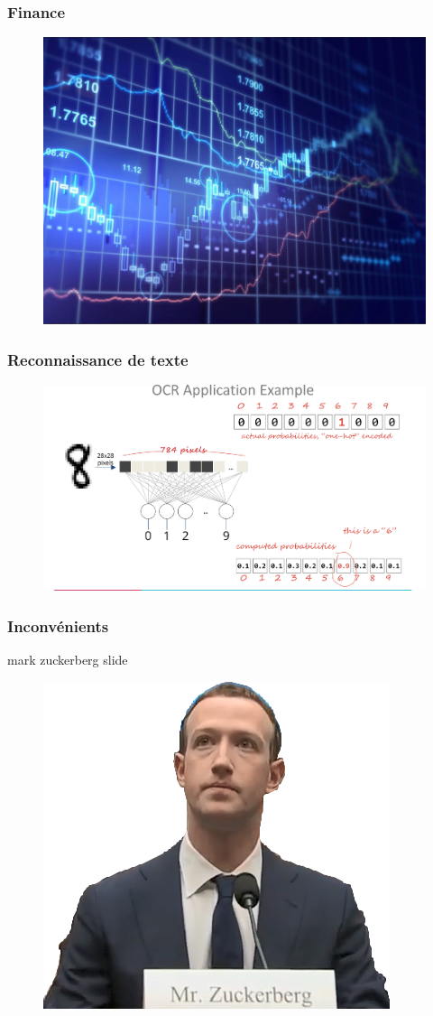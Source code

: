 \documentclass[compress]{beamer}
\begin{document}
\begin{frame}
	\frametitle{Finance}

	\begin{figure}
		\centering
		\includegraphics[width=0.9\linewidth]{resources/stock}

	\end{figure}


\end{frame}

\begin{frame}
	\frametitle{Reconnaissance de texte}

	\begin{figure}
		\centering
		\includegraphics[width=1\linewidth]{resources/text}
	\end{figure}

\end{frame}

\begin{frame}
	\frametitle{Inconvénients}

	mark zuckerberg slide
		\begin{figure}
			\centering
			\includegraphics[width=0.72\linewidth]{resources/clem/zucc}
		\end{figure}
\end{frame}
\end{document}
